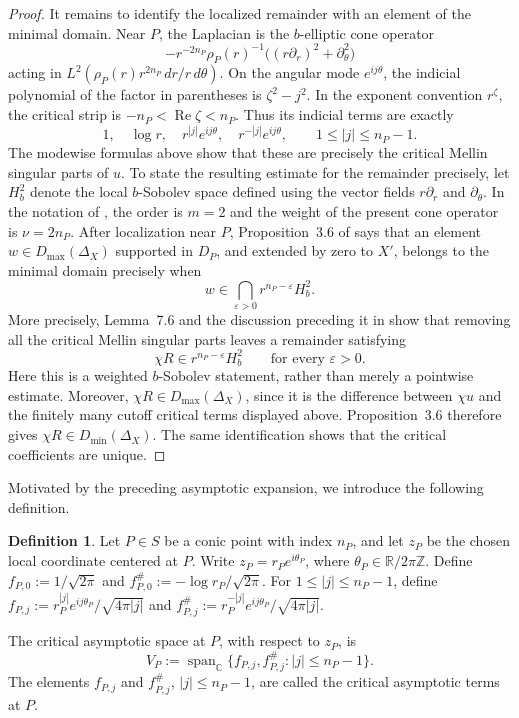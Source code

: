\documentclass[12pt]{amsart}
\theoremstyle{plain}
\theoremstyle{definition}
\newtheorem{defn}[thm]{Definition}
\theoremstyle{remark}
\numberwithin{equation}{section} \numberwithin{figure}{section}
\begin{document}
\begin{proof}
It remains to identify the localized remainder with an element of the
minimal domain. Near \(P\), the Laplacian is the \(b\)-elliptic cone
operator
\[
    -r^{-2n_P}\rho_P(r)^{-1}
    \bigl((r\partial_r)^2+\partial_\theta^2\bigr)
\]
acting in
\(L^2(\rho_P(r)r^{2n_P}\,dr/r\,d\theta)\). On the angular mode
\(e^{ij\theta}\), the indicial polynomial of the factor in
parentheses is \(\zeta^2-j^2\). In the exponent convention
\(r^\zeta\), the critical strip is
\(-n_P<\operatorname{Re}\zeta<n_P\). Thus its indicial terms are
exactly
\[
    1,\quad \log r,\quad
    r^{|j|}e^{ij\theta},\quad r^{-|j|}e^{ij\theta},
    \qquad 1\leq |j|\leq n_P-1.
\]
The modewise formulas above show that these are precisely the critical
Mellin singular parts of \(u\). To state the resulting estimate for the
remainder precisely, let \(H_b^2\) denote the local \(b\)-Sobolev space
defined using the vector fields \(r\partial_r\) and
\(\partial_\theta\). In the notation of \cite{gjb}, the order is
\(m=2\) and the weight of the present cone operator is
\(\nu=2n_P\). After localization near \(P\),
Proposition~3.6 of \cite{gjb} says that an element
\(w\in D_{\max}(\Delta_X)\) supported in \(D_P\), and extended by zero
to \(X'\), belongs to the minimal domain precisely when
\[
    w\in
    \bigcap_{\varepsilon>0}
    r^{n_P-\varepsilon}H_b^2.
\]
More precisely, Lemma~7.6 and the discussion preceding it in
\cite{gjb} show that removing all the critical Mellin singular parts
leaves a remainder satisfying
\[
    \chi R\in r^{n_P-\varepsilon}H_b^2
    \qquad\text{for every }\varepsilon>0.
\]
Here this is a weighted \(b\)-Sobolev statement, rather than merely a
pointwise estimate. Moreover, \(\chi R\in D_{\max}(\Delta_X)\), since
it is the difference between \(\chi u\) and the finitely many cutoff
critical terms displayed above. Proposition~3.6 therefore gives
\(\chi R\in D_{\min}(\Delta_X)\). The same identification shows that
the critical coefficients are unique.
\end{proof}

Motivated by the preceding asymptotic expansion, we introduce the
following definition.

\begin{defn}
Let \(P\in S\) be a conic point with index \(n_P\), and let \(z_P\) be
the chosen local coordinate centered at \(P\). Write
\(z_P=r_Pe^{i\theta_P}\), where
\(\theta_P\in\mathbb R/2\pi\mathbb Z\). Define
\(f_{P,0}:=1/\sqrt{2\pi}\) and
\(f_{P,0}^{\#}:=-\log r_P/\sqrt{2\pi}\). For
\(1\leq |j|\leq n_P-1\), define
\(f_{P,j}:=r_P^{|j|}e^{ij\theta_P}/\sqrt{4\pi|j|}\) and
\(f_{P,j}^{\#}:=r_P^{-|j|}e^{ij\theta_P}/\sqrt{4\pi|j|}\).

The critical asymptotic space at \(P\), with respect to \(z_P\), is
\[
V_P
:=
\operatorname{span}_{\mathbb C}
\bigl\{
f_{P,j},f_{P,j}^{\#}:|j|\leq n_P-1
\bigr\}.
\]
The elements \(f_{P,j}\) and \(f_{P,j}^{\#}\),
\(|j|\leq n_P-1\), are called the critical asymptotic terms at \(P\).
\end{defn}
\end{document}
